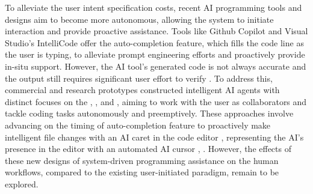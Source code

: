 To alleviate the user intent specification costs, recent AI programming tools and designs aim to become more autonomous, allowing the system to initiate interaction and provide proactive assistance.
Tools like Github Copilot \cite{githubcopilot} and Visual Studio’s IntelliCode \cite{Svyatkovskiy2020intellicode} offer the auto-completion feature, which fills the code line as the user is typing, to alleviate prompt engineering efforts and proactively provide in-situ support.
However, the AI tool's generated code is not always accurate and the output still requires significant user effort to verify \cite{vaithilingam2022expectation, Vaithilingam2023intellicode, Mozannar2022ReadingBT, liang2024usabilityCopilot}.
To address this, commercial and research prototypes constructed intelligent AI agents with distinct focuses on the , , and , aiming to work with the user as collaborators and tackle coding tasks autonomously and preemptively.
These approaches involve advancing on the timing of auto-completion feature to proactively make intelligent file changes with an AI caret in the code editor \cite{cursorcopilot++}, representing the AI's presence in the editor with an automated AI cursor \cite{geniusbydiagram}, .
However, the effects of these new designs of system-driven programming assistance on the human workflows, compared to the existing user-initiated paradigm, remain to be explored.

